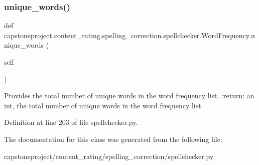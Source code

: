 \subsubsection{\texorpdfstring{unique\+\_\+words()}{unique\_words()}}
{\footnotesize\ttfamily def capstoneproject.\+content\+\_\+rating.\+spelling\+\_\+correction.\+spellchecker.\+Word\+Frequency.\+unique\+\_\+words (\begin{DoxyParamCaption}\item[{}]{self }\end{DoxyParamCaption})}

\begin{DoxyVerb}Provides the total number of unique words in the word frequency list.
:return: an int, the total number of unique words in the word frequency list.
\end{DoxyVerb}
 

Definition at line 203 of file spellchecker.\+py.



The documentation for this class was generated from the following file\+:\begin{DoxyCompactItemize}
\item 
capstoneproject/content\+\_\+rating/spelling\+\_\+correction/spellchecker.\+py\end{DoxyCompactItemize}
